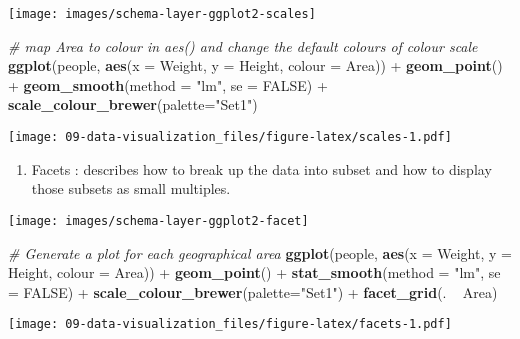 \documentclass[]{book}
\newenvironment{Shaded}{\begin{snugshade}}{\end{snugshade}}
\newcommand{\KeywordTok}[1]{\textcolor[rgb]{0.13,0.29,0.53}{\textbf{{#1}}}}
\newcommand{\DataTypeTok}[1]{\textcolor[rgb]{0.13,0.29,0.53}{{#1}}}
\newcommand{\StringTok}[1]{\textcolor[rgb]{0.31,0.60,0.02}{{#1}}}
\newcommand{\CommentTok}[1]{\textcolor[rgb]{0.56,0.35,0.01}{\textit{{#1}}}}
\newcommand{\OtherTok}[1]{\textcolor[rgb]{0.56,0.35,0.01}{{#1}}}
\newcommand{\NormalTok}[1]{{#1}}
\providecommand{\tightlist}{%
  \setlength{\itemsep}{0pt}\setlength{\parskip}{0pt}}
\def\tightlist{}
\begin{document}
\texttt{[image: images/schema-layer-ggplot2-scales]}

\begin{Shaded}
\begin{Highlighting}[]
\CommentTok{# map Area to colour in aes() and change the default colours of colour scale  }
\KeywordTok{ggplot}\NormalTok{(people, }\KeywordTok{aes}\NormalTok{(}\DataTypeTok{x =} \NormalTok{Weight, }\DataTypeTok{y =} \NormalTok{Height, }\DataTypeTok{colour =} \NormalTok{Area)) +}
\StringTok{  }\KeywordTok{geom_point}\NormalTok{() +}
\StringTok{  }\KeywordTok{geom_smooth}\NormalTok{(}\DataTypeTok{method =} \StringTok{"lm"}\NormalTok{, }\DataTypeTok{se =} \OtherTok{FALSE}\NormalTok{) +}
\StringTok{  }\KeywordTok{scale_colour_brewer}\NormalTok{(}\DataTypeTok{palette=}\StringTok{"Set1"}\NormalTok{)}
\end{Highlighting}
\end{Shaded}

\texttt{[image: 09-data-visualization\_files/figure-latex/scales-1.pdf]}

\begin{enumerate}
\def\labelenumi{\arabic{enumi}.}
\setcounter{enumi}{4}
\tightlist
\item
   {Facets} : describes how to break up the data into subset and how to
  display those subsets as small multiples.
\end{enumerate}

\texttt{[image: images/schema-layer-ggplot2-facet]}

\begin{Shaded}
\begin{Highlighting}[]
\CommentTok{# Generate a plot for each geographical area}
\KeywordTok{ggplot}\NormalTok{(people, }\KeywordTok{aes}\NormalTok{(}\DataTypeTok{x =} \NormalTok{Weight, }\DataTypeTok{y =} \NormalTok{Height, }\DataTypeTok{colour =} \NormalTok{Area)) +}
\StringTok{  }\KeywordTok{geom_point}\NormalTok{() +}
\StringTok{  }\KeywordTok{stat_smooth}\NormalTok{(}\DataTypeTok{method =} \StringTok{"lm"}\NormalTok{, }\DataTypeTok{se =} \OtherTok{FALSE}\NormalTok{) +}\StringTok{ }
\StringTok{  }\KeywordTok{scale_colour_brewer}\NormalTok{(}\DataTypeTok{palette=}\StringTok{"Set1"}\NormalTok{) +}
\StringTok{  }\KeywordTok{facet_grid}\NormalTok{(. ~}\StringTok{ }\NormalTok{Area)}
\end{Highlighting}
\end{Shaded}

\texttt{[image: 09-data-visualization\_files/figure-latex/facets-1.pdf]}
\end{document}
